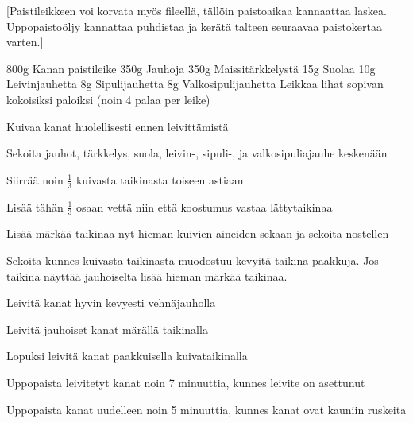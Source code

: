 [Paistileikkeen voi korvata myös fileellä, tällöin paistoaikaa kannaattaa laskea. Uppopaistoöljy kannattaa puhdistaa ja kerätä talteen seuraavaa paistokertaa varten.]

\begin{step}
  800g Kanan paistileike
  350g Jauhoja
  350g Maissitärkkelystä
  15g Suolaa
  10g Leivinjauhetta
  8g Sipulijauhetta
  8g Valkosipulijauhetta
  \method
  Leikkaa lihat sopivan kokoisiksi paloiksi (noin 4 palaa per leike)

  Kuivaa kanat huolellisesti ennen leivittämistä

  Sekoita jauhot, tärkkelys, suola, leivin-, sipuli-, ja valkosipuliajauhe keskenään

  Siirrää noin $\frac{1}{3}$ kuivasta taikinasta toiseen astiaan

  Lisää tähän $\frac{1}{3}$ osaan vettä niin että koostumus vastaa lättytaikinaa

  Lisää märkää taikinaa nyt hieman kuivien aineiden sekaan ja sekoita nostellen

  Sekoita kunnes kuivasta taikinasta muodostuu kevyitä taikina paakkuja. Jos taikina näyttää jauhoiselta lisää hieman märkää taikinaa.

  Leivitä kanat hyvin kevyesti vehnäjauholla

  Leivitä jauhoiset kanat märällä taikinalla

  Lopuksi leivitä kanat paakkuisella kuivataikinalla

  Uppopaista leivitetyt kanat  noin 7 minuuttia, kunnes leivite on asettunut

  Uppopaista kanat uudelleen  noin 5 minuuttia, kunnes kanat ovat kauniin ruskeita
\end{step}
